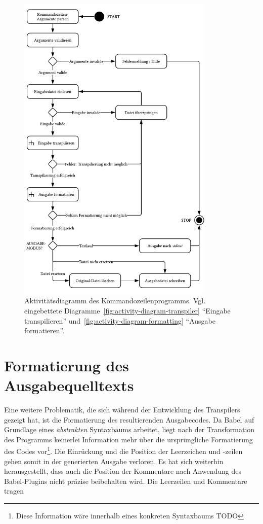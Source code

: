 \begin{figure}[p]
  \centering
  \includegraphics[width=0.84\textwidth]{src/4_Umsetzung/img/activity-diagram-transpiler-cli.pdf}
	\caption[Aktivitätsdiagramm des Kommandozeilenprogramms]{Aktivitätsdiagramm des Kommandozeilenprogramms. Vgl. eingebettete Diagramme~\ref{fig:activity-diagram-transpiler} \enquote{Eingabe transpilieren} und~\ref{fig:activity-diagram-formatting} \enquote{Ausgabe formatieren}.}
	\label{fig:activity-diagram-transpiler-cli}
\end{figure}

\section{Formatierung des Ausgabequelltexts}

Eine weitere Problematik, die sich während der Entwicklung des Transpilers gezeigt hat, ist die Formatierung des resultierenden Ausgabecodes. Da Babel auf Grundlage eines \emph{abstrakten} Syntaxbaums arbeitet, liegt nach der Transformation des Programms keinerlei Information mehr über die ursprüngliche Formatierung des Codes vor\footnote{Diese Information wäre innerhalb eines konkreten Syntaxbaums TODO}. Die Einrückung und die Position der Leerzeichen und -zeilen gehen somit in der generierten Ausgabe verloren. Es hat sich weiterhin herausgestellt, dass auch die Position der Kommentare nach Anwendung des Babel-Plugins nicht präzise beibehalten wird. Die Leerzeilen und Kommentare tragen

